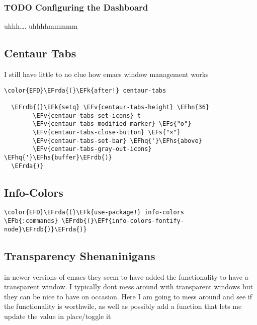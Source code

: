 \documentclass{article}
\newcommand{\EFs}[1]{\textcolor{EFs}{#1}} %
\newcommand{\EFk}[1]{\textcolor{EFk}{#1}} %
\newcommand{\EFb}[1]{\textcolor{EFb}{#1}} %
\newcommand{\EFf}[1]{\textcolor{EFf}{#1}} %
\newcommand{\EFv}[1]{\textcolor{EFv}{#1}} %
\newcommand{\EFhn}[1]{\textcolor{EFhn}{\textbf{#1}}} %
\newcommand{\EFhq}[1]{#1} %
\newcommand{\EFhs}[1]{\textcolor{EFhs}{#1}} %
\newcommand{\EFrda}[1]{\textcolor{EFrda}{#1}} %
\newcommand{\EFrdb}[1]{\textcolor{EFrdb}{#1}} %
\begin{document}
\subsubsection{{\bfseries\sffamily TODO} Configuring the Dashboard}
\label{sec:org8fa0601}
uhhh\ldots{}. uhhhhmmmmm
\subsection{Centaur Tabs}
\label{sec:org5ec219d}
I still have little to no clue how emacs window management works
\begin{Code}
\begin{Verbatim}
\color{EFD}\EFrda{(}\EFk{after!} centaur-tabs

  \EFrdb{(}\EFk{setq} \EFv{centaur-tabs-height} \EFhn{36}
        \EFv{centaur-tabs-set-icons} t
        \EFv{centaur-tabs-modified-marker} \EFs{"o"}
        \EFv{centaur-tabs-close-button} \EFs{"×"}
        \EFv{centaur-tabs-set-bar} \EFhq{'}\EFhs{above}
        \EFv{centaur-tabs-gray-out-icons} \EFhq{'}\EFhs{buffer}\EFrdb{)}
  \EFrda{)}
\end{Verbatim}
\end{Code}

\subsection{Info-Colors}
\label{sec:orgec1b403}
\begin{Code}
\begin{Verbatim}
\color{EFD}\EFrda{(}\EFk{use-package!} info-colors
\EFb{:commands} \EFrdb{(}\EFf{info-colors-fontify-node}\EFrdb{)}\EFrda{)}
\end{Verbatim}
\end{Code}

\subsection{Transparency Shenaninigans}
\label{sec:orgcc6176f}
in newer versions of emacs they seem to have added the functionality to have a transparent window. I typically dont mess around with transparent windows but they can be nice to have on occasion. Here I am going to mess around and see if the functionality is worthwile, as well as possibly add a function that lets me update the value in place/toggle it
\end{document}
